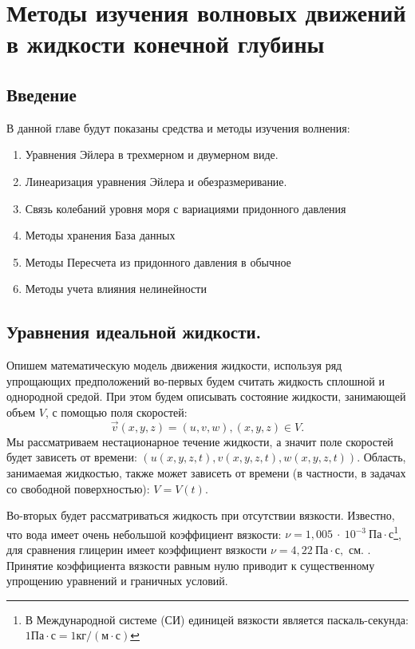 \chapter{Методы изучения волновых движений в жидкости конечной глубины} \label{chapt1}

\section{Введение}

В данной главе будут показаны средства и методы изучения волнения:
\begin{enumerate}
  \item Уравнения Эйлера в трехмерном и двумерном виде.
  \item Линеаризация уравнения Эйлера и обезразмеривание.
  \item Связь колебаний уровня моря с вариациями придонного давления
  \item Методы хранения База данных
  \item Методы Пересчета из придонного давления в обычное
  \item Методы учета влияния нелинейности
\end{enumerate}
\section{Уравнения идеальной жидкости.}


Опишем математическую модель движения жидкости, используя ряд упрощающих предположений во-первых будем считать жидкость сплошной и однородной средой. При этом будем описывать состояние жидкости, занимающей объем $V$, с помощью поля скоростей:
$$
\overrightarrow v(x,y,z)=(u,v,w), (x,y,z)\in V.
$$
Мы рассматриваем нестационарное течение жидкости, а значит поле скоростей будет зависеть от
вре\-ме\-ни: $(u(x,y,z,t),v(x,y,z,t),w(x,y,z,t))$. Область, занимаемая жидкостью, также может зависеть от времени (в частности, в задачах со свободной поверхностью): $V=V(t)$.

Во-вторых будет рассматриваться жидкость при отсутствии вязкости. Известно, что  вода имеет очень небольшой коэффициент вязкости:
$\nu=1,005~\cdot~10^{-3}\ \mbox{Па}\cdot\mbox{с}$\footnote{В Международной системе (СИ) единицей вязкости является паскаль-секунда:
$1\mbox{Па}\cdot\mbox{с}=1\mbox{кг}/(\mbox{м}\cdot\mbox{с})$}, для сравнения глицерин имеет коэффициент вязкости $\nu=4,22\ \mbox{Па}\cdot\mbox{с},$ см. \cite{loyts}. Принятие коэффициента вязкости равным нулю приводит к существенному упрощению уравнений и граничных условий.

